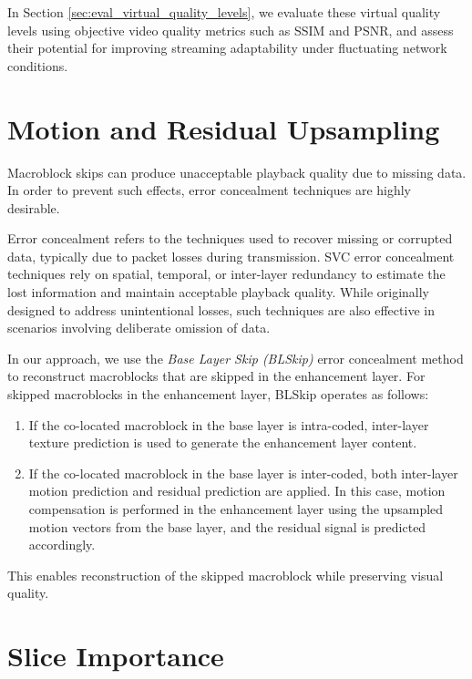     In Section \ref{sec:eval_virtual_quality_levels}, we evaluate these virtual quality levels using
    objective video quality metrics such as SSIM and PSNR, and assess
    their potential for improving streaming adaptability under fluctuating
    network conditions.


\section{Motion and Residual Upsampling}
\label{sec:blskip}
    Macroblock skips can produce unacceptable playback quality due to missing
    data.  In order to prevent such effects, error concealment techniques are
    highly desirable.

    Error concealment refers to the techniques used to recover missing or
    corrupted data, typically due to packet losses during transmission. SVC error concealment techniques
    rely on spatial, temporal, or inter-layer redundancy to estimate the
    lost information and maintain acceptable playback quality. While originally
    designed to address unintentional losses, such techniques are also effective in
    scenarios involving deliberate omission of data.

    In our approach, we use the \textit{Base Layer Skip (BLSkip)} error
    concealment method to reconstruct macroblocks that are skipped in
    the enhancement layer. For skipped macroblocks in the enhancement layer, BLSkip
    operates as follows:
    
    \begin{enumerate}
        \item 
        If the co-located macroblock in the base layer is
        intra-coded, inter-layer texture prediction is used to generate the enhancement
        layer content. 
        
        \item
        If the co-located macroblock in the base layer is inter-coded, both inter-layer
        motion prediction and residual prediction are applied. In this case, motion
        compensation is performed in the enhancement layer using the upsampled
        motion vectors from the base layer, and the residual signal is predicted
        accordingly. 
    \end{enumerate}
    
    This enables reconstruction of the skipped macroblock while preserving visual quality.


\section{Slice Importance}
\label{sec:slice_imp}

